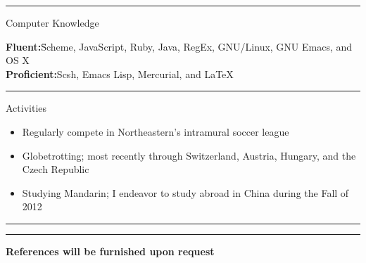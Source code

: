 \documentclass[10pt]{letter}
\begin{document}


\rule{\linewidth}{.5pt}


{\Large Computer Knowledge}
\begin{tabbing}
\textbf{Fluent:}\hspace{.5in}\=Scheme, JavaScript, Ruby, Java, RegEx,
GNU/Linux, GNU Emacs, and OS X\\
\textbf{Proficient:}\>Scsh, Emacs Lisp, Mercurial, and \LaTeX
\end{tabbing}

\rule{\linewidth}{.5pt}

{\Large Activities}
\begin{itemize}
\setlength\itemsep{1pt}
\item Regularly compete in Northeastern's intramural soccer league
\item Globetrotting; most recently through Switzerland, Austria, Hungary, and
  the Czech Republic
\item Studying Mandarin; I endeavor to study abroad in China during the Fall of 2012
\end{itemize}

\rule{\linewidth}{.5pt}

\vspace{-15pt}

\rule{\linewidth}{.5pt}

\begin{center}\textbf{References will be furnished upon request}\end{center}
\end{document}
